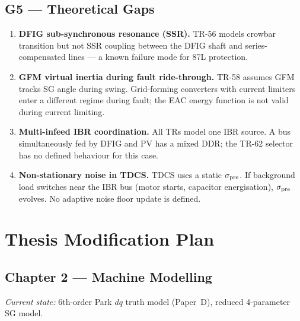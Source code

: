 \documentclass[12pt,a4paper]{article}
\begin{document}
\subsection{G5 — Theoretical Gaps}

\begin{enumerate}
  \item \textbf{DFIG sub-synchronous resonance (SSR).}  TR-56 models crowbar transition
    but not SSR coupling between the DFIG shaft and series-compensated lines — a known
    failure mode for 87L protection.
  \item \textbf{GFM virtual inertia during fault ride-through.}  TR-58 assumes GFM tracks
    SG angle during swing.  Grid-forming converters with current limiters enter a
    different regime during fault; the EAC energy function is not valid during current limiting.
  \item \textbf{Multi-infeed IBR coordination.}  All TRs model one IBR source.
    A bus simultaneously fed by DFIG and PV has a mixed DDR; the TR-62 selector has
    no defined behaviour for this case.
  \item \textbf{Non-stationary noise in TDCS.}  TDCS uses a static $\sigma_{\rm pre}$.
    If background load switches near the IBR bus (motor starts, capacitor energisation),
    $\sigma_{\rm pre}$ evolves.  No adaptive noise floor update is defined.
\end{enumerate}

\section{Thesis Modification Plan}
\label{sec:thesis_plan}

\subsection{Chapter 2 — Machine Modelling}

\textit{Current state:} 6th-order Park $dq$ truth model (Paper~D), reduced 4-parameter SG model.
\end{document}
